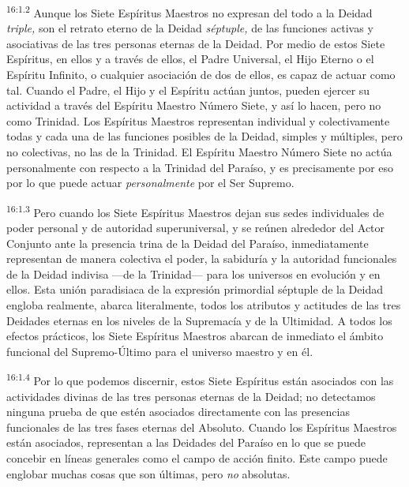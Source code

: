 \par
\textsuperscript{16:1.2} Aunque los Siete Espíritus Maestros no expresan del todo a la Deidad \textit{triple,} son el retrato eterno de la Deidad \textit{séptuple,} de las funciones activas y asociativas de las tres personas eternas de la Deidad. Por medio de estos Siete Espíritus, en ellos y a través de ellos, el Padre Universal, el Hijo Eterno o el Espíritu Infinito, o cualquier asociación de dos de ellos, es capaz de actuar como tal. Cuando el Padre, el Hijo y el Espíritu actúan juntos, pueden ejercer su actividad a través del Espíritu Maestro Número Siete, y así lo hacen, pero no como Trinidad. Los Espíritus Maestros representan individual y colectivamente todas y cada una de las funciones posibles de la Deidad, simples y múltiples, pero no colectivas, no las de la Trinidad. El Espíritu Maestro Número Siete no actúa personalmente con respecto a la Trinidad del Paraíso, y es precisamente por eso por lo que puede actuar \textit{personalmente} por el Ser Supremo.

\par
\textsuperscript{16:1.3} Pero cuando los Siete Espíritus Maestros dejan sus sedes individuales de poder personal y de autoridad superuniversal, y se reúnen alrededor del Actor Conjunto ante la presencia trina de la Deidad del Paraíso, inmediatamente representan de manera colectiva el poder, la sabiduría y la autoridad funcionales de la Deidad indivisa ---de la Trinidad--- para los universos en evolución y en ellos. Esta unión paradisiaca de la expresión primordial séptuple de la Deidad engloba realmente, abarca literalmente, todos los atributos y actitudes de las tres Deidades eternas en los niveles de la Supremacía y de la Ultimidad. A todos los efectos prácticos, los Siete Espíritus Maestros abarcan de inmediato el ámbito funcional del Supremo-Último para el universo maestro y en él.

\par
\textsuperscript{16:1.4} Por lo que podemos discernir, estos Siete Espíritus están asociados con las actividades divinas de las tres personas eternas de la Deidad; no detectamos ninguna prueba de que estén asociados directamente con las presencias funcionales de las tres fases eternas del Absoluto. Cuando los Espíritus Maestros están asociados, representan a las Deidades del Paraíso en lo que se puede concebir en líneas generales como el campo de acción finito. Este campo puede englobar muchas cosas que son últimas, pero \textit{no} absolutas.

